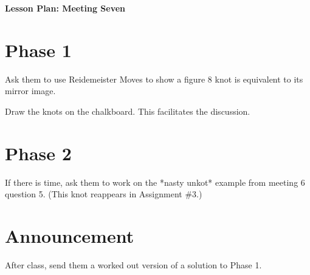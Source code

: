 \documentclass[12pt]{amsart}
\theoremstyle{definition}
\begin{document}
\begin{center}
\textbf{\Huge
Lesson Plan: Meeting Seven
}
\end{center}
\vspace{.5in}

\section*{Phase 1}
Ask them to use Reidemeister Moves to show a figure 8 knot is equivalent to its mirror image.

Draw the knots on the chalkboard. This facilitates the discussion.

\section*{Phase 2}
If there is time, ask them to work on the *nasty unkot* example from meeting 6 question 5. (This knot reappears in Assignment \#3.)

\section*{Announcement}
After class, send them a worked out version of a solution to Phase 1.
\end{document}
